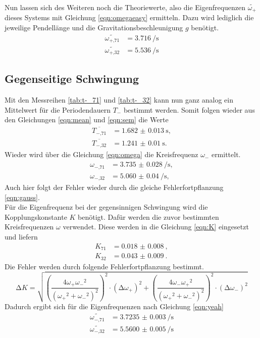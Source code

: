 Nun lassen sich des Weiteren noch die Theoriewerte, also die Eigenfrequenzen $\widetilde{\omega_{+}}$ dieses Systems mit Gleichung \eqref{eqn:omegaeasy} ermitteln. Dazu wird lediglich die jeweilige Pendellänge und die Gravitationsbeschleunigung $g$ \cite{naturkonstanten} benötigt.
\begin{align}
    \widetilde{\omega_{+\text{,}71}} &= \SI{3.716}{\per\second} \\
    \widetilde{\omega_{+\text{,}32}} &=  \SI{5.536}{\per\second}
\end{align}

\subsection{Gegenseitige Schwingung}
Mit den Messreihen \ref{tab:t-_71} und \ref{tab:t-_32} kann nun ganz analog ein Mittelwert für die Periodendauern $T_{-}$ bestimmt werden. Somit folgen wieder aus den Gleichungen \eqref{eqn:mean} und \eqref{eqn:sem} die Werte
\begin{align*}
    \overline{T_{-\text{,}71}} &= \SI{1.682(13)}{\second}, \\
    \overline{T_{-\text{,}32}} &= \SI{1.241(10)}{\second}.
\end{align*}
Wieder wird über die Gleichung \eqref{eqn:omega} die Kreisfrequenz $\omega_{-}$ ermittelt.
\begin{align}
    \omega_{-\text{,}71} &= \SI{3.735(28)}{\per\second}, \\
    \omega_{-\text{,}32} &= \SI{5.060(40)}{\per\second}, 
\end{align}
Auch hier folgt der Fehler wieder durch die gleiche Fehlerfortpflanzung \eqref{eqn:gauss}.
\\
Für die Eigenfrequenz bei der gegensinnigen Schwingung wird die Kopplungskonstante $K$ benötigt. Dafür werden die zuvor bestimmten Kreisfrequenzen $\omega$ verwendet.
Diese werden in die Gleichung \eqref{eqn:K} eingesetzt und liefern
\begin{align*}
K_{71} &= \SI{0.018(8)}{}, \\
K_{32} &= \SI{0.043(9)}{}.
\end{align*}
Die Fehler werden durch folgende Fehlerfortpflanzung bestimmt.
\begin{equation}
\increment K = \sqrt{\left(\frac{4{\omega_{+}} {\omega_{-}}^2}{({\omega_{+}}^2 + {\omega_{-}}^2)^2}\right)^2 \cdot (\increment {\omega_{+}})^2 + \left(\frac{4{\omega_{-}} {\omega_{+}}^2}{({\omega_{+}}^2 + {\omega_{-}}^2)^2}\right)^2 \cdot (\increment {\omega_{-}})^2}
\end{equation}
Dadurch ergibt sich für die Eigenfrequenzen nach Gleichung \eqref{eqn:yeah}
\begin{align*}
    \widetilde{\omega_{-\text{,}71}} &= \SI{3.7235(30)}{\per\second} \\
    \widetilde{\omega_{-\text{,}32}} &=  \SI{5.5600(50)}{\per\second}
\end{align*}

